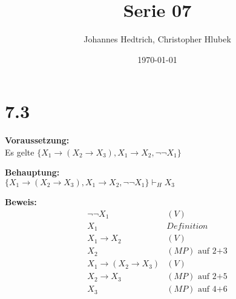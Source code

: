\documentclass[12pt,a4paper]{scrartcl}
\title{Serie 07}
\author{Johannes Hedtrich, Christopher Hlubek}
\date{\today}
\begin{document}
  \section*{7.3}
  \noindent
  \textbf{Voraussetzung:}\\
  
  Es gelte $\{X_1 \rightarrow (X_2 \rightarrow X_3), X_1 \rightarrow X_2, \neg \neg X_1\}$

  \noindent
  \textbf{Behauptung:}\\ 
  
  $\{X_1 \rightarrow (X_2 \rightarrow X_3), X_1 \rightarrow X_2, \neg \neg X_1\} \vdash_H X_3$

  \noindent
  \textbf{Beweis:}\\
  
  \begin{align}
    & \neg \neg X_1 & (V)\\
    & X_1 & Definition &\\
    & X_1 \rightarrow X_2 & (V)\\
    & X_2 & (MP) \text{ auf 2+3}\\
    & X_1 \rightarrow (X_2 \rightarrow X_3) & (V)\\
    & X_2 \rightarrow X_3 & (MP) \text{ auf 2+5}\\
    & X_3 & (MP) \text{ auf 4+6}
  \end{align}
\end{document}
